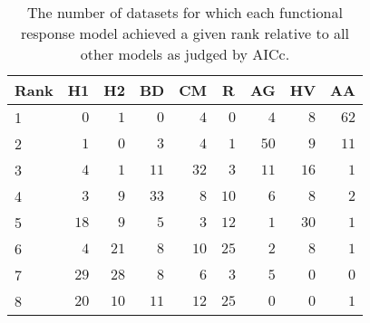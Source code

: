 \begin{table}[!tbp]
\caption{The number of datasets for which each functional response model achieved a given rank relative to all other models as judged by AICc.\label{table:AICc_rankings}} 
\begin{center}
\begin{tabular}{lrrrrrrrr}
\hline\hline
\multicolumn{1}{l}{Rank}&\multicolumn{1}{c}{H1}&\multicolumn{1}{c}{H2}&\multicolumn{1}{c}{BD}&\multicolumn{1}{c}{CM}&\multicolumn{1}{c}{R}&\multicolumn{1}{c}{AG}&\multicolumn{1}{c}{HV}&\multicolumn{1}{c}{AA}\tabularnewline
\hline
1&$ 0$&$ 1$&$ 0$&$ 4$&$ 0$&$ 4$&$ 8$&$62$\tabularnewline
2&$ 1$&$ 0$&$ 3$&$ 4$&$ 1$&$50$&$ 9$&$11$\tabularnewline
3&$ 4$&$ 1$&$11$&$32$&$ 3$&$11$&$16$&$ 1$\tabularnewline
4&$ 3$&$ 9$&$33$&$ 8$&$10$&$ 6$&$ 8$&$ 2$\tabularnewline
5&$18$&$ 9$&$ 5$&$ 3$&$12$&$ 1$&$30$&$ 1$\tabularnewline
6&$ 4$&$21$&$ 8$&$10$&$25$&$ 2$&$ 8$&$ 1$\tabularnewline
7&$29$&$28$&$ 8$&$ 6$&$ 3$&$ 5$&$ 0$&$ 0$\tabularnewline
8&$20$&$10$&$11$&$12$&$25$&$ 0$&$ 0$&$ 1$\tabularnewline
\hline
\end{tabular}\end{center}
\end{table}
